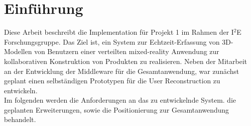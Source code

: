 \section{Einführung}

Diese Arbeit beschreibt die Implementation für Projekt 1 im Rahmen der I$^2$E Forschungsgruppe. Das Ziel ist, ein System zur Echtzeit-Erfassung von 3D-Modellen von Benutzern einer verteilten mixed-reality Anwendung zur kollaborativen Konstruktion von Produkten zu realisieren. Neben der Mitarbeit an der Entwicklung der Middleware für die Gesamtanwendung, war zunächst geplant einen selbständigen Prototypen für die User Reconstruction zu entwickeln.\\
Im folgenden werden die Anforderungen an das zu entwickelnde System. die geplanten Erweiterungen, sowie die Positionierung zur Gesamtanwendung behandelt.